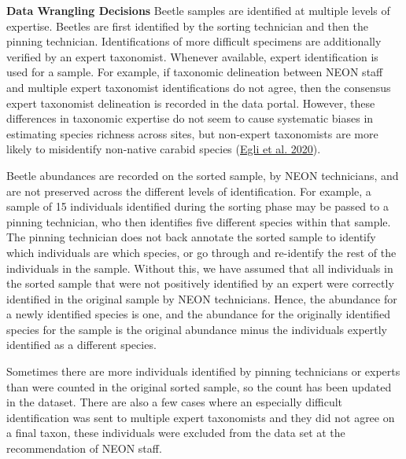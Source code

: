 \documentclass[
  12pt,
]{article}
\begin{document}
\textbf{Data Wrangling Decisions} Beetle samples are identified at multiple levels of expertise. Beetles are first identified by the sorting technician and then the pinning technician. Identifications of more difficult specimens are additionally verified by an expert taxonomist. Whenever available, expert identification is used for a sample. For example, if taxonomic delineation between NEON staff and multiple expert taxonomist identifications do not agree, then the consensus expert taxonomist delineation is recorded in the data portal. However, these differences in taxonomic expertise do not seem to cause systematic biases in estimating species richness across sites, but non-expert taxonomists are more likely to misidentify non-native carabid species (\protect\hyperlink{ref-egli2020taxonomic}{Egli et al. 2020}).

Beetle abundances are recorded on the sorted sample, by NEON technicians, and are not preserved across the different levels of identification. For example, a sample of 15 individuals identified during the sorting phase may be passed to a pinning technician, who then identifies five different species within that sample. The pinning technician does not back annotate the sorted sample to identify which individuals are which species, or go through and re-identify the rest of the individuals in the sample. Without this, we have assumed that all individuals in the sorted sample that were not positively identified by an expert were correctly identified in the original sample by NEON technicians. Hence, the abundance for a newly identified species is one, and the abundance for the originally identified species for the sample is the original abundance minus the individuals expertly identified as a different species.

Sometimes there are more individuals identified by pinning technicians or experts than were counted in the original sorted sample, so the count has been updated in the dataset. There are also a few cases where an especially difficult identification was sent to multiple expert taxonomists and they did not agree on a final taxon, these individuals were excluded from the data set at the recommendation of NEON staff.
\end{document}
